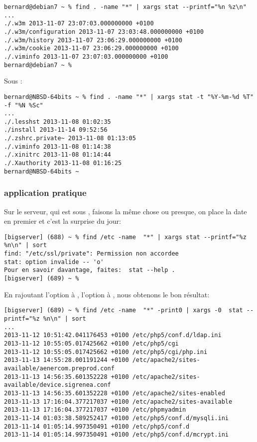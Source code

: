 \begin{lstlisting}
bernard@debian7 ~ % find . -name "*" | xargs stat --printf="%n %z\n"
...
./.w3m 2013-11-07 23:07:03.000000000 +0100
./.w3m/configuration 2013-11-07 23:03:48.000000000 +0100
./.w3m/history 2013-11-07 23:06:29.000000000 +0100
./.w3m/cookie 2013-11-07 23:06:29.000000000 +0100
./.viminfo 2013-11-07 23:07:03.000000000 +0100
bernard@debian7 ~ %
\end{lstlisting}

Sous \netbsd:

\begin{lstlisting}
bernard@NBSD-64bits ~ % find . -name "*" | xargs stat -t "%Y-%m-%d %T" -f "%N %Sc"
...
./.lesshst 2013-11-08 01:02:35
./install 2013-11-14 09:52:56
./.zshrc.private~ 2013-11-08 01:13:05
./.viminfo 2013-11-08 01:14:38
./.xinitrc 2013-11-08 01:14:44
./.Xauthority 2013-11-08 01:16:25
bernard@NBSD-64bits ~
\end{lstlisting}

\subsubsection{application pratique}
Sur le serveur, qui est sous \linux, faisons la même chose ou presque, on place la date en premier et c'est la surprise du jour:

\begin{lstlisting}
[bigserver] (688) ~ % find /etc -name  "*" | xargs stat --printf="%z %n\n" | sort
find: "/etc/ssl/private": Permission non accordee
stat: option invalide -- 'o'
Pour en savoir davantage, faites:  stat --help .
[bigserver] (689) ~ %
\end{lstlisting}

En rajoutant l'option  à , l'option  à , nous obtenons le bon résultat:

\begin{lstlisting}
[bigserver] (689) ~ % find /etc -name  "*" -print0 | xargs -0  stat --printf="%z %n\n" | sort
...
2013-11-12 10:51:42.041176453 +0100 /etc/php5/conf.d/ldap.ini
2013-11-12 10:55:05.017425662 +0100 /etc/php5/cgi
2013-11-12 10:55:05.017425662 +0100 /etc/php5/cgi/php.ini
2013-11-13 14:55:28.001191244 +0100 /etc/apache2/sites-available/aenercom.preprod.conf
2013-11-13 14:56:35.601352228 +0100 /etc/apache2/sites-available/device.sigrenea.conf
2013-11-13 14:56:35.601352228 +0100 /etc/apache2/sites-enabled
2013-11-13 17:16:04.377217037 +0100 /etc/apache2/sites-available
2013-11-13 17:16:04.377217037 +0100 /etc/phpmyadmin
2013-11-14 01:03:38.589252417 +0100 /etc/php5/conf.d/mysqli.ini
2013-11-14 01:05:14.997350491 +0100 /etc/php5/conf.d
2013-11-14 01:05:14.997350491 +0100 /etc/php5/conf.d/mcrypt.ini
\end{lstlisting}

